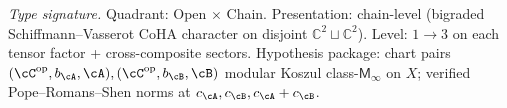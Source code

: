 \begin{theorem}
\label{thm:hdm-m-infty-tensor-kunneth}
\emph{Type signature.} Quadrant: Open $\times$ Chain. Presentation:
chain-level (bigraded Schiffmann--Vasserot CoHA character on disjoint
$\mathbb{C}^2\sqcup\mathbb{C}^2$). Level: $1\!\to\!3$ on each tensor
factor + cross-composite sectors. Hypothesis package: chart pairs
$(\cC^{\mathrm{op}}, b_\cA, \cA), (\cC^{\mathrm{op}}, b_\cB, \cB)$
modular Koszul class-$\mathsf{M}_\infty$ on $X$; verified
Pope--Romans--Shen norms at $c_\cA, c_\cB, c_\cA + c_\cB$.


\end{theorem}
